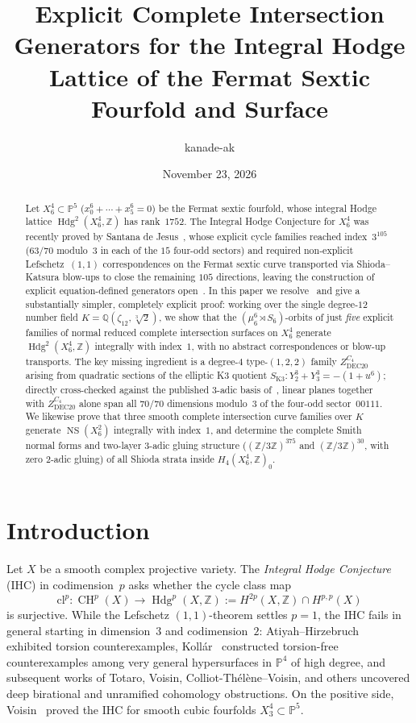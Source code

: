 \documentclass[11pt,a4paper]{amsart}
\title[Explicit Generators for Fermat Sextics]{Explicit Complete Intersection Generators for the Integral Hodge Lattice of the Fermat Sextic Fourfold and Surface}
\author{kanade-ak}
\date{November 23, 2026}
\theoremstyle{definition}
\newcommand{\ZZ}{\mathbb{Z}}
\newcommand{\QQ}{\mathbb{Q}}
\newcommand{\PP}{\mathbb{P}}
\newcommand{\Hdg}{\operatorname{Hdg}}
\newcommand{\NS}{\operatorname{NS}}
\newcommand{\CH}{\operatorname{CH}}
\begin{document}
\begin{abstract}
Let $X_6^4 \subset \PP^5$ ($x_0^6 + \cdots + x_5^6 = 0$) be the Fermat sextic fourfold, whose integral
Hodge lattice $\Hdg^2(X_6^4, \ZZ)$ has rank~$1752$.
The Integral Hodge Conjecture for $X_6^4$ was recently proved by Santana de Jesus~\cite{SdJ26},
whose explicit cycle families reached index~$3^{105}$ ($63/70$ modulo~$3$ in each of the $15$ four-odd
sectors) and required non-explicit Lefschetz~$(1,1)$ correspondences on the Fermat sextic curve
transported via Shioda--Katsura blow-ups to close the remaining $105$ directions, leaving the construction
of explicit equation-defined generators open~\cite[Remark~8(1)]{SdJ26}.
In this paper we resolve~\cite[Remark~8(1)]{SdJ26} and give a substantially simpler, completely explicit
proof: working over the single degree-$12$ number field $K = \QQ(\zeta_{12}, \sqrt[3]{2})$, we show that
the $(\mu_6^6 \rtimes S_6)$-orbits of just \emph{five} explicit families of normal reduced complete
intersection surfaces on $X_6^4$ generate $\Hdg^2(X_6^4, \ZZ)$ integrally with index~$1$, with no
abstract correspondences or blow-up transports.
The key missing ingredient is a degree-$4$ type-$(1,2,2)$ family $Z_{\mathrm{DEC20}}^{C_4}$ arising from
quadratic sections of the elliptic K3 quotient $S_{\mathrm{K3}} : Y_2^3 + Y_3^3 = -(1+u^6)$;
directly cross-checked against the published $3$-adic basis of~\cite{SdJ26}, linear planes together with
$Z_{\mathrm{DEC20}}^{C_4}$ alone span all $70/70$ dimensions modulo~$3$ of the four-odd sector~$00111$.
We likewise prove that three smooth complete intersection curve families over $K$ generate $\NS(X_6^2)$
integrally with index~$1$, and determine the complete Smith normal forms and two-layer $3$-adic gluing
structure ($(\ZZ/3\ZZ)^{375}$ and $(\ZZ/3\ZZ)^{30}$, with zero $2$-adic gluing) of all Shioda strata
inside $H_4(X_6^4, \ZZ)_0$.
\end{abstract}

\maketitle

\section{Introduction}

Let $X$ be a smooth complex projective variety. The \emph{Integral Hodge Conjecture} (IHC) in codimension~$p$ asks whether the cycle class map
\[
  \mathrm{cl}^p : \CH^p(X) \longrightarrow \Hdg^p(X, \ZZ) := H^{2p}(X, \ZZ) \cap H^{p,p}(X)
\]
is surjective. While the Lefschetz $(1,1)$-theorem settles $p = 1$, the IHC fails in general starting in dimension~$3$ and codimension~$2$: Atiyah--Hirzebruch~\cite{AH62} exhibited torsion counterexamples, Koll\'ar~\cite{Kol92} constructed torsion-free counterexamples among very general hypersurfaces in $\PP^4$ of high degree, and subsequent works of Totaro, Voisin, Colliot-Th\'el\`ene--Voisin, and others uncovered deep birational and unramified cohomology obstructions. On the positive side, Voisin~\cite{Voi13} proved the IHC for smooth cubic fourfolds $X_3^4 \subset \PP^5$.
\end{document}
